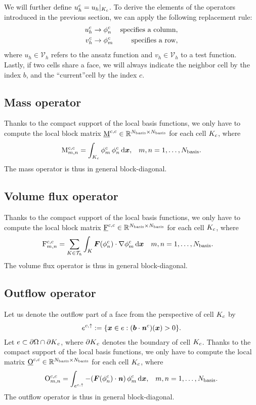 \documentclass{scrreprt}
\begin{document}
We will further define $u_h^c=u_h|_{K_c}$.
To derive the elements of the operators introduced
in the previous section, we can apply the following replacement rule:
\begin{align}
u_h^{c} &\rightarrow \phi^{c}_{n} & \textup{specifies a column}, \\
v_h^{c} &\rightarrow \phi^{c}_{m} & \textup{specifies a row},
\end{align}
where $u_h\in\mathcal{V}_h$ refers to the ansatz function and
$v_h\in\mathcal{V}_h$ to a test function.
Lastly, if two cells share a face, we will always indicate the
neighbor cell by the index $b$, and the ``current''cell
by the index $c$.
\subsection{Mass operator}
Thanks to the compact support of the local basis functions,
we only have to compute the local block matrix
$\underline{\mathrm{M}}^{c,c} \in \mathbb{R}^{N_\textup{basis} \times N_\textup{basis}}$ for each
cell $K_c$, where
\begin{align}
\mathrm{M}^{c,c}_{m,n} =
\int_{K_c}
\phi^{c}_{m}\,\phi^{c}_{n} \, \text{d}{\boldsymbol x},
&& m,n = 1,\ldots,N_\textup{basis}.
\end{align}
The mass operator is thus in general block-diagonal.
\subsection{Volume flux operator}
Thanks to the compact support of the local basis functions,
we only have to compute the local block matrix
$\underline{\mathrm{F}}^{c,c} \in \mathbb{R}^{N_\textup{basis} \times N_\textup{basis}}$ for each
cell $K_c$, where
\begin{align}
\label{eq:volume_flux_op}
\mathrm{F}^{c,c}_{m,n} &= \sum_{K \in \mathcal{T}_h} \int_K {\boldsymbol F}(\phi^{c}_{n}) \cdot
\nabla \phi^{c}_{m}\,\text{d}{\boldsymbol x}
&& m,n = 1,\ldots,N_\textup{basis}.
\end{align}
The volume flux operator is thus in general block-diagonal.
\subsection{Outflow operator}
Let us denote the outflow part of a face from the perspective of cell $K_c$
by
\begin{align}
e^{c,\uparrow} := \{ {\boldsymbol x} \in e : ({\boldsymbol b} \cdot
{\boldsymbol {\mathit{n}}}^{{c}})({\boldsymbol x})> 0\}.
\end{align}
Let $e \subset {\partial\Omega} \cap {\partial K}_c$, where ${\partial K}_c$
denotes the boundary of cell $K_c$.
Thanks to the compact support of the local basis functions, we only
have to compute the local matrix $\underline{\mathrm{O}}^{c,c} \in \mathbb{R}^{N_\textup{basis}
\times N_\textup{basis}}$ for each cell $K_c$, where
\begin{align}
\mathrm{O}^{c,c}_{m,n} =
\int_{e^{c,\uparrow}}
-
({\boldsymbol F}(\phi^{c}_{n})\cdot{\boldsymbol {\mathit{n}}})\,\phi^{c}_{m} \, \text{d}{\boldsymbol x},
&& m,n = 1,\ldots,N_\textup{basis}.
\end{align}
The outflow operator is thus in general block-diagonal.
\end{document}
